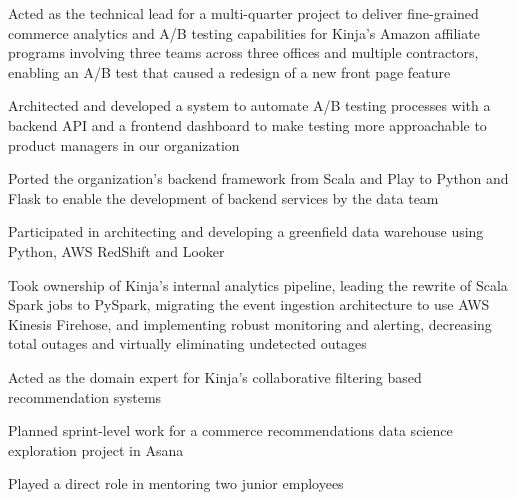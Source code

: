 \begin{job}

  \begin{accomplishments}
    \item Acted as the technical lead for a multi-quarter project to deliver
    fine-grained commerce analytics and A/B testing capabilities for Kinja's
    Amazon affiliate programs involving three teams across three offices and
    multiple contractors, enabling an A/B test that caused a redesign of a new
    front page feature
    \item Architected and developed a system to automate A/B testing processes
    with a backend API and a frontend dashboard to make testing more
    approachable to product managers in our organization
    \item Ported the organization's backend framework from Scala and Play to
    Python and Flask to enable the development of backend services by the data
    team
    \item Participated in architecting and developing a greenfield data
    warehouse using Python, AWS RedShift and Looker
    \item Took ownership of Kinja's internal analytics pipeline, leading the
    rewrite of Scala Spark jobs to PySpark, migrating the event ingestion
    architecture to use AWS Kinesis Firehose, and implementing robust monitoring
    and alerting, decreasing total outages and virtually eliminating undetected
    outages
    \item Acted as the domain expert for Kinja's collaborative filtering based
    recommendation systems
    \item Planned sprint-level work for a commerce recommendations data science
    exploration project in Asana
    \item Played a direct role in mentoring two junior employees
  \end{accomplishments}
\end{job}
